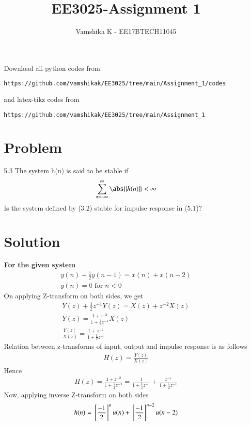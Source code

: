 \documentclass[journal,12pt,twocolumn]{IEEEtran}
\begin{document}
\def\rightbox#1{\makebox[0in][r]{#1}}
\def\centbox#1{\makebox[0in]{#1}}
\def\topbox#1{\raisebox{-\baselineskip}[0in][0in]{#1}}
\def\midbox#1{\raisebox{-0.5\baselineskip}[0in][0in]{#1}}
\vspace{3cm}
\title{EE3025-Assignment 1}
\author{Vamshika K - EE17BTECH11045}
\maketitle
\newpage
\bigskip
\renewcommand{\thefigure}{\theenumi}
\renewcommand{\thetable}{\theenumi}
Download all python codes from 
\begin{lstlisting}
https://github.com/vamshikak/EE3025/tree/main/Assignment_1/codes
\end{lstlisting}
%
and latex-tikz codes from 
%
\begin{lstlisting}
https://github.com/vamshikak/EE3025/tree/main/Assignment_1
\end{lstlisting}
\section{Problem}
5.3 The system h(n) is said to be stable if 
\begin{align}
\sum_{n=-\infty}^{\infty} \abs{|h(n)|} < \infty
\end{align} 
Is the system defined by (3.2) stable for impulse response in (5.1)?
\section{Solution}
\textbf{For the given system}
\begin{align}
    y(n)+\frac{1}{2}y(n-1) = x(n)+x(n-2) \\
    y(n)=0 \text{ for }n<0
\end{align}
On applying Z-transform on both sides, we get
\begin{align}
    Y(z) + \frac{1}{2}z^{-1}Y(z)=X(z) + z^{-2}X(z)\\
    Y(z)=\frac{1+z^{-2}}{1+\frac{1}{2}z^{-1}}X(z)\\
 \frac{Y(z)}{X(z)}=\frac{1+z^{-2}}{1+\frac{1}{2}z^{-1}}
\end{align}
Relation between z-transforms of input, output and impulse response is as follows
\begin{align}
    H(z) = \frac{Y(z)}{X(z)}
\end{align}
Hence 
\begin{align}
H(z)=\frac{1+z^{-2}}{1+\frac{1}{2}z^{-1}}
    =\frac{1}{1+\frac{1}{2}z^{-1}} + \frac{z^{-2}}{1+\frac{1}{2}z^{-1}}
\end{align}
Now, applying inverse Z-transform on both sides
\begin{align}
h(n)={}\left[\frac{-1}{2}\right]^nu(n) + {}\left[\frac{-1}{2}\right]^{n-2}u(n-2)
\end{align}
\end{document}
